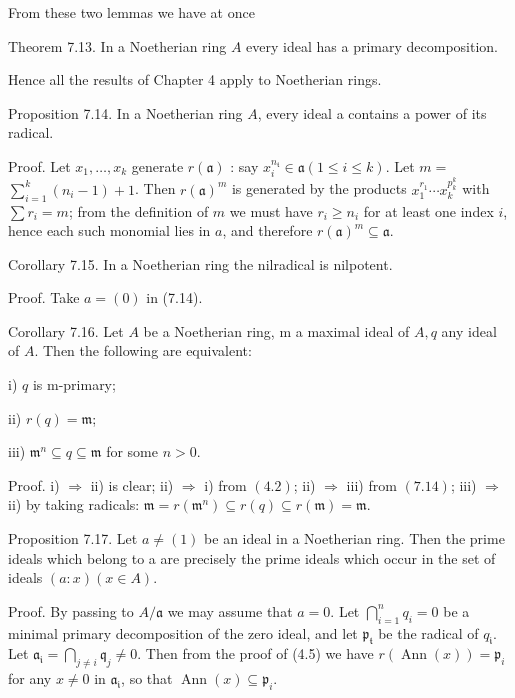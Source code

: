 \documentclass{standalone}
\theoremstyle{definition}
\theoremstyle{remark}
\begin{document}
From these two lemmas we have at once

Theorem 7.13. In a Noetherian ring $A$ every ideal has a primary decomposition.

Hence all the results of Chapter 4 apply to Noetherian rings.

Proposition 7.14. In a Noetherian ring $A$, every ideal a contains a power of its radical.

Proof. Let $x_{1}, \ldots, x_{k}$ generate $r(\mathfrak{a})$ : say $x_{i}^{n_{\mathfrak{t}}} \in \mathfrak{a}(1 \leqslant i \leqslant k)$. Let $m=$ $\sum_{i=1}^{k}\left(n_{i}-1\right)+1$. Then $r(\mathfrak{a})^{m}$ is generated by the products $x_{1}^{r_{1}} \cdots x_{k}^{p_{k}^{k}}$ with $\sum r_{i}=m$; from the definition of $m$ we must have $r_{i} \geqslant n_{i}$ for at least one index $i$, hence each such monomial lies in $a$, and therefore $r(\mathfrak{a})^{m} \subseteq \mathfrak{a}$.

Corollary 7.15. In a Noetherian ring the nilradical is nilpotent.

Proof. Take $a=(0)$ in (7.14).

Corollary 7.16. Let $A$ be a Noetherian ring, m a maximal ideal of $A, q$ any ideal of $A$. Then the following are equivalent:

i) $q$ is m-primary;

ii) $r(q)=\mathfrak{m}$;

iii) $\mathfrak{m}^{n} \subseteq q \subseteq \mathfrak{m}$ for some $n>0$.

Proof. i) $\Rightarrow$ ii) is clear; ii) $\Rightarrow$ i) from $(4.2)$; ii) $\Rightarrow$ iii) from $(7.14)$; iii) $\Rightarrow$ ii) by taking radicals: $\mathfrak{m}=r\left(\mathfrak{m}^{n}\right) \subseteq r(q) \subseteq r(\mathfrak{m})=\mathfrak{m}$.

Proposition 7.17. Let $a \neq(1)$ be an ideal in a Noetherian ring. Then the prime ideals which belong to a are precisely the prime ideals which occur in the set of ideals $(a: x)(x \in A)$.

Proof. By passing to $A / \mathfrak{a}$ we may assume that $a=0$. Let $\bigcap_{i=1}^{n} q_{i}=0$ be a minimal primary decomposition of the zero ideal, and let $\mathfrak{p}_{\mathfrak{t}}$ be the radical of $q_{\mathfrak{i}}$. Let $\mathfrak{a}_{\mathfrak{i}}=\bigcap_{j \neq i} \mathfrak{q}_{j} \neq 0$. Then from the proof of (4.5) we have $r(\operatorname{Ann}(x))=\mathfrak{p}_{i}$ for any $x \neq 0$ in $\mathfrak{a}_{\mathfrak{i}}$, so that $\operatorname{Ann}(x) \subseteq \mathfrak{p}_{i}$.
\end{document}
